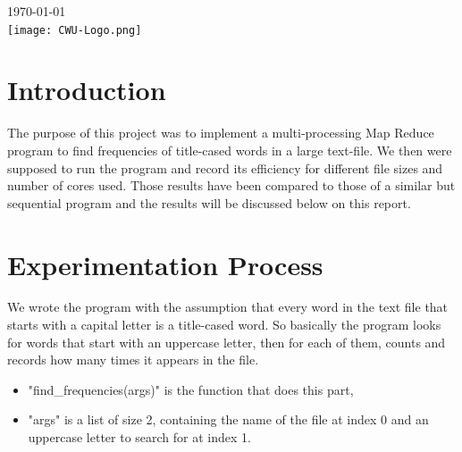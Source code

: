 \documentclass[12pt]{article}
\begin{document}
\begin{titlepage}
		
		
		{\large \today}\\ %
		
		
		\texttt{[image: CWU-Logo.png]}\\[.5cm] %
		
		
		\vfill %
		
	\end{titlepage}
	\newpage
	\tableofcontents
	\newpage
	
	
	
	\section{Introduction}
		The purpose of this project was to implement a multi-processing Map Reduce program to find frequencies of title-cased words in a large text-file. We then were supposed to run the program and record its efficiency for different file sizes and number of cores used. Those results have been compared to those of a similar but sequential program and the results will be discussed below on this report.
	
	\section{Experimentation Process}
		We wrote the program with the assumption that every word in the text file that starts with a capital letter is a title-cased word. So basically the program looks for words that start with an uppercase letter, then for each of them, counts and records how many times it appears in the file. 
		\begin{itemize}
			\item "find\_frequencies(args)" is the function that does this part,
			\item "args" is a list of size 2, containing the name of the file at index 0 and an uppercase letter to search for at index 1.
		\end{itemize}
	
\end{document}
